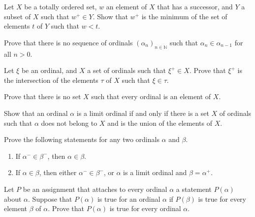 \documentclass{article}
\begin{document}
\begin{exercise}
  \label{exe:ylp1zcc8}
  Let \(X\) be a totally ordered set, \(w\) an element of \(X\) that
  has a successor, and \(Y\) a subset of \(X\) such that
  \(w^+ \in Y\).  Show that \(w^+\) is the minimum of the set of
  elements \(t\) of \(Y\) such that \(w < t\).
\end{exercise}

\begin{exercise}
  \label{exe:p8w4gyx9}
  Prove that there is no sequence of ordinals
  \((\alpha_n)_{n \in \mathbb{N}}\) such that
  \(\alpha_n \in \alpha_{n-1}\) for all \(n > 0\).
\end{exercise}

\begin{exercise}
  \label{exe:ddc4bdfk}
  Let \(\xi\) be an ordinal, and \(X\) a set of ordinals such that
  \(\xi^+ \in X\).  Prove that \(\xi^+\) is the intersection of the
  elements \(\tau\) of \(X\) such that \(\xi \in \tau\).
\end{exercise}

\begin{exercise}
  \label{exe:9pk4eh7k}
  Prove that there is no set \(X\) such that every ordinal is an
  element of \(X\).
\end{exercise}

\begin{exercise}
  \label{exe:vj15laqs}
  Show that an ordinal \(\alpha\) is a limit ordinal if and only if
  there is a set \(X\) of ordinals such that \(\alpha\) does not
  belong to \(X\) and is the union of the elements of \(X\).
\end{exercise}

\begin{exercise}
  \label{exe:7tvca54w}
  Prove the following statements for any two ordinals \(\alpha\) and
  \(\beta\).
  \begin{enumerate}
  \item If \(\alpha^- \in \beta^-\), then \(\alpha \in \beta\).
  \item If \(\alpha \in \beta\), then either \(\alpha^- \in \beta^-\),
    or \(\alpha\) is a limit ordinal and \(\beta = \alpha^+\).
  \end{enumerate}
\end{exercise}

\begin{exercise}
  \label{exe:jxzsy88l}
  Let \(P\) be an assignment that attaches to every ordinal \(\alpha\)
  a statement \(P(\alpha)\) about \(\alpha\).  Suppose that
  \(P(\alpha)\) is true for an ordinal \(\alpha\) if \(P(\beta)\) is
  true for every element \(\beta\) of \(\alpha\).  Prove that
  \(P(\alpha)\) is true for every ordinal \(\alpha\).
\end{exercise}
\end{document}

